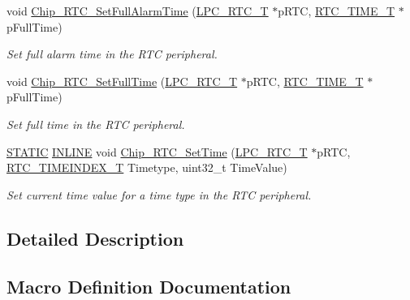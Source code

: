 \begin{DoxyCompactItemize}
void \hyperlink{group__RTC__17XX__40XX_ga7ad6b4d1d2aaaf093ddde0cef9023ba0}{Chip\+\_\+\+R\+T\+C\+\_\+\+Set\+Full\+Alarm\+Time} (\hyperlink{structLPC__RTC__T}{L\+P\+C\+\_\+\+R\+T\+C\+\_\+T} $\ast$p\+R\+TC, \hyperlink{structRTC__TIME__T}{R\+T\+C\+\_\+\+T\+I\+M\+E\+\_\+T} $\ast$p\+Full\+Time)
\begin{DoxyCompactList}\small\item\em Set full alarm time in the R\+TC peripheral. \end{DoxyCompactList}\item 
void \hyperlink{group__RTC__17XX__40XX_ga501471295a030ca2dc2872577367073e}{Chip\+\_\+\+R\+T\+C\+\_\+\+Set\+Full\+Time} (\hyperlink{structLPC__RTC__T}{L\+P\+C\+\_\+\+R\+T\+C\+\_\+T} $\ast$p\+R\+TC, \hyperlink{structRTC__TIME__T}{R\+T\+C\+\_\+\+T\+I\+M\+E\+\_\+T} $\ast$p\+Full\+Time)
\begin{DoxyCompactList}\small\item\em Set full time in the R\+TC peripheral. \end{DoxyCompactList}\item 
\hyperlink{group__LPC__Types__Public__Macros_ga10b2d890d871e1489bb02b7e70d9bdfb}{S\+T\+A\+T\+IC} \hyperlink{group__LPC__Types__Public__Types_ga2eb6f9e0395b47b8d5e3eeae4fe0c116}{I\+N\+L\+I\+NE} void \hyperlink{group__RTC__17XX__40XX_ga8104b580aeb00a3d5a9e325b3162b1bb}{Chip\+\_\+\+R\+T\+C\+\_\+\+Set\+Time} (\hyperlink{structLPC__RTC__T}{L\+P\+C\+\_\+\+R\+T\+C\+\_\+T} $\ast$p\+R\+TC, \hyperlink{group__RTC__17XX__40XX_ga8144898fe628404d396db06dc8aac0e0}{R\+T\+C\+\_\+\+T\+I\+M\+E\+I\+N\+D\+E\+X\+\_\+T} Timetype, uint32\+\_\+t Time\+Value)
\begin{DoxyCompactList}\small\item\em Set current time value for a time type in the R\+TC peripheral. \end{DoxyCompactList}\end{DoxyCompactItemize}


\subsection{Detailed Description}


\subsection{Macro Definition Documentation}
